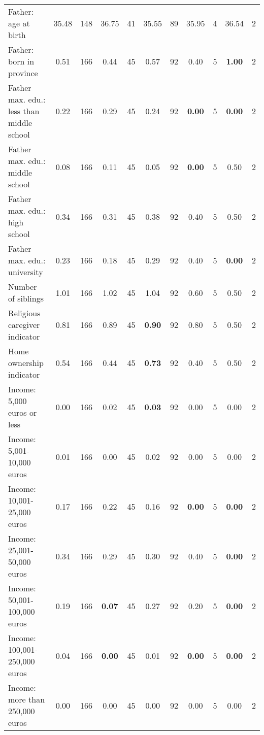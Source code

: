 \begin{tabular}{l c c c c c c c c c c}
Father: age at birth &     35.48 &       148 &     36.75 &        41 &     35.55 &        89 &     35.95 &         4 &     36.54 &         2 \\
Father: born in province &      0.51 &       166 &      0.44 &        45 &      0.57 &        92 &      0.40 &         5 & \textbf{     1.00} &         2 \\
Father max. edu.: less than middle school &      0.22 &       166 &      0.29 &        45 &      0.24 &        92 & \textbf{     0.00} &         5 & \textbf{     0.00} &         2 \\
Father max. edu.: middle school &      0.08 &       166 &      0.11 &        45 &      0.05 &        92 & \textbf{     0.00} &         5 &      0.50 &         2 \\
Father max. edu.: high school &      0.34 &       166 &      0.31 &        45 &      0.38 &        92 &      0.40 &         5 &      0.50 &         2 \\
Father max. edu.: university &      0.23 &       166 &      0.18 &        45 &      0.29 &        92 &      0.40 &         5 & \textbf{     0.00} &         2 \\
Number of siblings &      1.01 &       166 &      1.02 &        45 &      1.04 &        92 &      0.60 &         5 &      0.50 &         2 \\
Religious caregiver indicator &      0.81 &       166 &      0.89 &        45 & \textbf{     0.90} &        92 &      0.80 &         5 &      0.50 &         2 \\
Home ownership indicator &      0.54 &       166 &      0.44 &        45 & \textbf{     0.73} &        92 &      0.40 &         5 &      0.50 &         2 \\
Income: 5,000 euros or less &      0.00 &       166 &      0.02 &        45 & \textbf{     0.03} &        92 &      0.00 &         5 &      0.00 &         2 \\
Income: 5,001-10,000 euros &      0.01 &       166 &      0.00 &        45 &      0.02 &        92 &      0.00 &         5 &      0.00 &         2 \\
Income: 10,001-25,000 euros &      0.17 &       166 &      0.22 &        45 &      0.16 &        92 & \textbf{     0.00} &         5 & \textbf{     0.00} &         2 \\
Income: 25,001-50,000 euros &      0.34 &       166 &      0.29 &        45 &      0.30 &        92 &      0.40 &         5 & \textbf{     0.00} &         2 \\
Income: 50,001-100,000 euros &      0.19 &       166 & \textbf{     0.07} &        45 &      0.27 &        92 &      0.20 &         5 & \textbf{     0.00} &         2 \\
Income: 100,001-250,000 euros &      0.04 &       166 & \textbf{     0.00} &        45 &      0.01 &        92 & \textbf{     0.00} &         5 & \textbf{     0.00} &         2 \\
Income: more than 250,000 euros &      0.00 &       166 &      0.00 &        45 &      0.00 &        92 &      0.00 &         5 &      0.00 &         2 \\
\bottomrule
\end{tabular}
